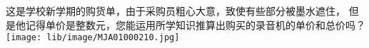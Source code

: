 这是学校新学期的购货单，由于采购员粗心大意，致使有些部分被墨水遮住，
但是他记得单价是整数元，您能运用所学知识推算出购买的录音机的单价和总价吗？
\texttt{[image: lib/image/MJA01000210.jpg]}